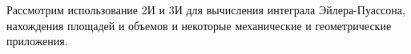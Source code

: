 \documentclass[../../main.tex]{subfiles}
\begin{document}
	Рассмотрим использование 2И и 3И для вычисления интеграла Эйлера-Пуассона, 
	нахождения площадей и объемов и некоторые механические и геометрические 
	приложения.
	
\end{document}
